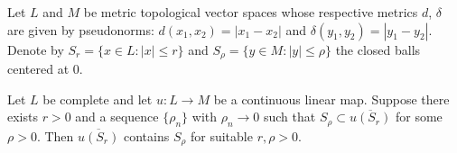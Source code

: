 Let $L$ and $M$ be metric topological vector spaces whose respective metrics $d$, $\delta$ are given by pseudonorms: $d(x_1, x_2) = |x_1 - x_2|$ and $\delta(y_1, y_2) = |y_1 - y_2|$. Denote by $S_r = \{x \in L : |x| \leq r\}$ and $S_\rho = \{y \in M : |y| \leq \rho\}$ the closed balls centered at 0.

Let $L$ be complete and let $u: L \to M$ be a continuous linear map. Suppose there exists $r > 0$ and a sequence $\{\rho_n\}$ with $\rho_n \to 0$ such that $S_\rho \subset \overline{u(S_r)}$ for some $\rho > 0$. Then $\overline{u(S_r)}$ contains $S_\rho$ for suitable $r, \rho > 0$.
